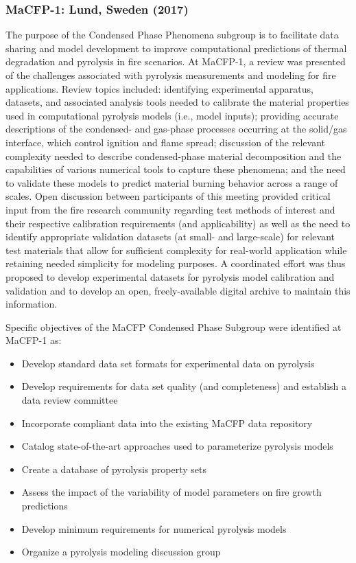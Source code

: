 \documentclass[12pt,demo]{article}
\begin{document}
\subsubsection{MaCFP-1: Lund, Sweden (2017)}
The purpose of the Condensed Phase Phenomena subgroup is to facilitate data sharing and model development to improve computational predictions of thermal degradation and pyrolysis in fire scenarios. At MaCFP-1, a review was  presented of the challenges associated with pyrolysis measurements and modeling for fire applications. Review topics included: identifying experimental apparatus, datasets, and associated analysis tools needed to calibrate the material properties used in computational pyrolysis models (i.e., model inputs); providing accurate descriptions of the condensed- and gas-phase processes occurring at the solid/gas interface, which control ignition and flame spread; discussion of the relevant complexity needed to describe condensed-phase material decomposition and the capabilities of various numerical tools to capture these phenomena; and the need to validate these models to predict material burning behavior across a range of scales. Open discussion between participants of this meeting provided critical input from the fire research community regarding test methods of interest and their respective calibration requirements (and applicability) as well as the need to identify appropriate validation datasets (at small- and large-scale) for relevant test materials that allow for sufficient complexity for real-world application while retaining needed simplicity for modeling purposes. A coordinated effort was thus proposed to develop experimental datasets for pyrolysis model calibration and validation and to develop an open, freely-available digital archive to maintain this information.

Specific objectives of the MaCFP Condensed Phase Subgroup were identified at MaCFP-1 as:
\begin{itemize}[noitemsep]
\item Develop standard data set formats for experimental data on pyrolysis
\item Develop requirements for data set quality (and completeness) and establish a data review committee
\item Incorporate compliant data into the existing MaCFP data repository
\item Catalog state-of-the-art approaches used to parameterize pyrolysis models
\item Create a database of pyrolysis property sets
\item Assess the impact of the variability of model parameters on fire growth predictions
\item Develop minimum requirements for numerical pyrolysis models
\item Organize a pyrolysis modeling discussion group
\end{itemize}
\end{document}
